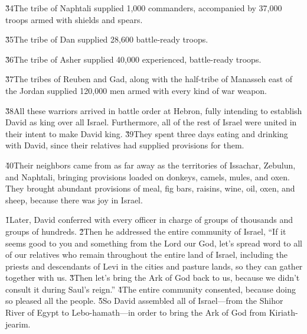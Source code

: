 \v{34}The tribe of Naphtali supplied 1,000 commanders, accompanied by 37,000 troops armed with shields and spears.

\v{35}The tribe of Dan supplied 28,600 battle-ready troops.

\v{36}The tribe of Asher supplied 40,000 experienced, battle-ready troops.

\v{37}The tribes of Reuben and Gad, along with the half-tribe of Manasseh east of the Jordan supplied 120,000 men armed with every kind of war weapon.

\v{38}All these warriors arrived in battle order at Hebron, fully intending to establish David as king over all Israel. Furthermore, all of the rest of Israel were united in their intent to make David king. \v{39}They spent three days eating and drinking with David, since their relatives had supplied provisions for them.

\v{40}Their neighbors came from as far away as the territories of Issachar, Zebulun, and Naphtali, bringing provisions loaded on donkeys, camels, mules, and oxen. They brought abundant provisions of meal, fig bars, raisins, wine, oil, oxen, and sheep, because there was joy in Israel.

\v{1}Later, David conferred with every officer in charge of groups of thousands and groups of hundreds. \v{2}Then he addressed the entire community of Israel, ``If it seems good to you and something from the Lord our God, let's spread word to all of our relatives who remain throughout the entire land of Israel, including the priests and descendants of Levi in the cities and pasture lands, so they can gather together with us. \v{3}Then let's bring the Ark of God back to us, because we didn't consult it during Saul's reign.'' \v{4}The entire community consented, because doing so pleased all the people. \v{5}So David assembled all of Israel---from the Shihor River of Egypt to Lebo-hamath---in order to bring the Ark of God from Kiriath-jearim.

